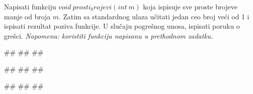 \begin{Exercise}[label=p1.4_] 
 Napisati funkciju $void\ prosti_brojevi(int\ m)$ koja ispisuje sve proste brojeve manje od broja $m$.  Zatim sa standardnog ulaza učitati jedan ceo broj veći od 1 i ispisati rezultat poziva funkcije. U slučaju pogrešnog unosa, ispisati poruku o grešci. \textit{Napomena: koristiti funkciju napisanu u prethodnom zadatku.} 
 
\begin{miditest}
\begin{upotreba}{1}
#\naslovInt#
##
##
\end{upotreba}
\end{miditest}
\begin{miditest}
\begin{upotreba}{2}
#\naslovInt#
##
##
\end{upotreba}
\end{miditest}

\begin{miditest}
\begin{upotreba}{3}
#\naslovInt#
##
##
\end{upotreba}
\end{miditest}
\fi



\begin{comment}
\begin{Exercise}[label=p1.4_11] 
 Napisati funkciju $float\ aritmeticka\_sredina(int\ n)$ koja računa aritmetičku sredinu cifara datog broja. Napisati i program koji testira rad napisane funkcije. Rezultat ispisivati na tri decimale.
 
\begin{miditest}
\begin{upotreba}{1}
#\naslovInt#
#\izlaz{Unesite broj:}\ulaz{461}#
#\izlaz{3.667}#
\end{upotreba}
\end{miditest}
\begin{miditest}
\begin{upotreba}{2}
#\naslovInt#
#\izlaz{Unesite broj:}\ulaz{1001}#
#\izlaz{0.500}#
\end{upotreba}
\end{miditest}

\begin{miditest}
\begin{upotreba}{3}
#\naslovInt#
#\izlaz{Unesite broj:}\ulaz{-84723}#
#\izlaz{4.800}#
\end{upotreba}
\end{miditest}


\end{comment}
\end{Exercise}
